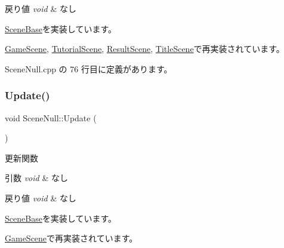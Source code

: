 \begin{DoxyRetVals}{戻り値}
{\em void} & なし \\
\hline
\end{DoxyRetVals}


\mbox{\hyperlink{class_scene_base_a175987954480e29219a4e3a1d840bbe4}{Scene\+Base}}を実装しています。



\mbox{\hyperlink{class_game_scene_a8b96bb5d72109ab37729f05f4f78c43e}{Game\+Scene}}, \mbox{\hyperlink{class_tutorial_scene_a988a579b179fc989876b28e24fae7591}{Tutorial\+Scene}}, \mbox{\hyperlink{class_result_scene_a17c396c63a5575a545cd771ece012140}{Result\+Scene}}, \mbox{\hyperlink{class_title_scene_a65fcb66cfab634ff7b0f6b69bbc63d7c}{Title\+Scene}}で再実装されています。



 Scene\+Null.\+cpp の 76 行目に定義があります。

\mbox{\label{class_scene_null_a79de810b699f496fda20e4ac837d075a}} 
\subsubsection{\texorpdfstring{Update()}{Update()}}
{\footnotesize\ttfamily void Scene\+Null\+::\+Update (\begin{DoxyParamCaption}{ }\end{DoxyParamCaption})\hspace{0.3cm}{\ttfamily [virtual]}}



更新関数 


\begin{DoxyParams}{引数}
{\em void} & なし \\
\hline
\end{DoxyParams}

\begin{DoxyRetVals}{戻り値}
{\em void} & なし \\
\hline
\end{DoxyRetVals}


\mbox{\hyperlink{class_scene_base_a596ef75258a6e4d843d81f01cc0c28da}{Scene\+Base}}を実装しています。



\mbox{\hyperlink{class_game_scene_a4a7840220ef38af15def6d25159c93f3}{Game\+Scene}}で再実装されています。



